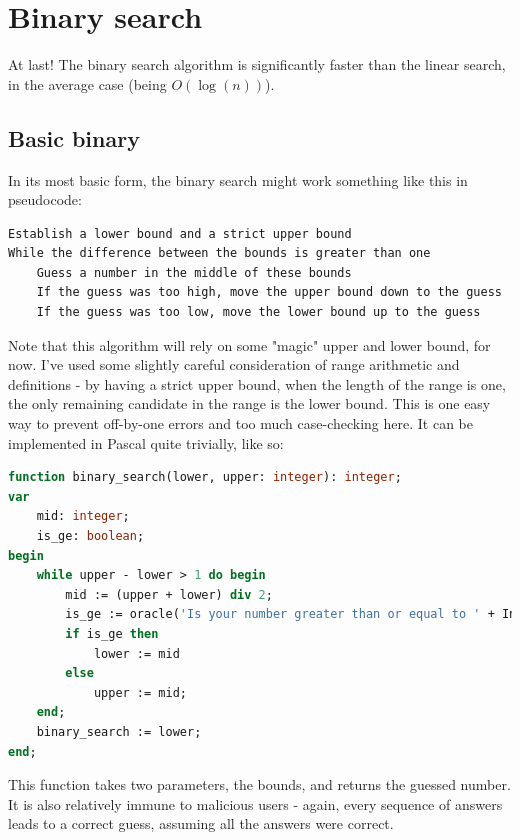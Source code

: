 \documentclass{article}
\begin{document}
    \section{Binary search}
    At last! The binary search algorithm is significantly faster than the
    linear search, in the average case (being $O(\log(n))$).
    
    \subsection{Basic binary}
    In its most basic form, the binary search might work something like this in
    pseudocode:

\begin{lstlisting}[caption=Basic binary search pseudocode]
Establish a lower bound and a strict upper bound
While the difference between the bounds is greater than one
    Guess a number in the middle of these bounds
    If the guess was too high, move the upper bound down to the guess
    If the guess was too low, move the lower bound up to the guess
\end{lstlisting}

    Note that this algorithm will rely on some "magic" upper and lower bound,
    for now. I've used some slightly careful consideration of range arithmetic
    and definitions - by having a strict upper bound, when the length of the
    range is one, the only remaining candidate in the range is the lower bound.
    This is one easy way to prevent off-by-one errors and too much
    case-checking here. It can be implemented in Pascal quite trivially, like
    so:

\begin{lstlisting}[language=Pascal, caption=Basic binary search in Pascal, label={lst:binarysearch}]
function binary_search(lower, upper: integer): integer;
var
    mid: integer;
    is_ge: boolean;
begin
    while upper - lower > 1 do begin
        mid := (upper + lower) div 2;
        is_ge := oracle('Is your number greater than or equal to ' + IntToStr(mid) + '? ');
        if is_ge then
            lower := mid
        else
            upper := mid;
    end;
    binary_search := lower;
end;
\end{lstlisting}

    This function takes two parameters, the bounds, and returns the guessed
    number. It is also relatively immune to malicious users - again, every
    sequence of answers leads to a correct guess, assuming all the answers were
    correct.
\end{document}
